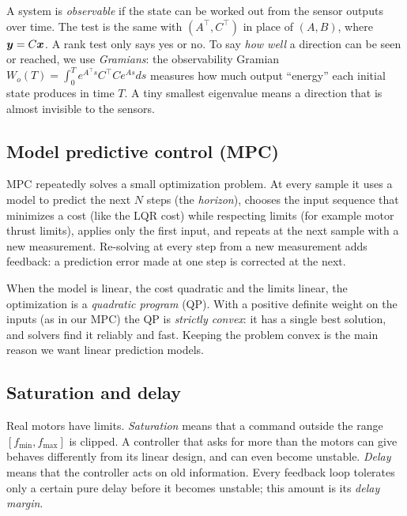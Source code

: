A system is \emph{observable} if the state can be worked out from the sensor outputs over time. The test is the same with $(A^\top, C^\top)$ in place of $(A, B)$, where $\boldsymbol{y} = C\boldsymbol{x}$. A rank test only says yes or no. To say \emph{how well} a direction can be seen or reached, we use \emph{Gramians}: the observability Gramian $W_o(T)=\int_0^T e^{A^\top s}C^\top C e^{As}ds$ measures how much output ``energy'' each initial state produces in time $T$. A tiny smallest eigenvalue means a direction that is almost invisible to the sensors.

\subsection{Model predictive control (MPC)}
MPC repeatedly solves a small optimization problem. At every sample it uses a model to predict the next $N$ steps (the \emph{horizon}), chooses the input sequence that minimizes a cost (like the LQR cost) while respecting limits (for example motor thrust limits), applies only the first input, and repeats at the next sample with a new measurement. Re-solving at every step from a new measurement adds feedback: a prediction error made at one step is corrected at the next.

When the model is linear, the cost quadratic and the limits linear, the optimization is a \emph{quadratic program} (QP). With a positive definite weight on the inputs (as in our MPC) the QP is \emph{strictly convex}: it has a single best solution, and solvers find it reliably and fast. Keeping the problem convex is the main reason we want linear prediction models.

\subsection{Saturation and delay}
Real motors have limits. \emph{Saturation} means that a command outside the range $[f_{\min}, f_{\max}]$ is clipped. A controller that asks for more than the motors can give behaves differently from its linear design, and can even become unstable. \emph{Delay} means that the controller acts on old information. Every feedback loop tolerates only a certain pure delay before it becomes unstable; this amount is its \emph{delay margin}.

